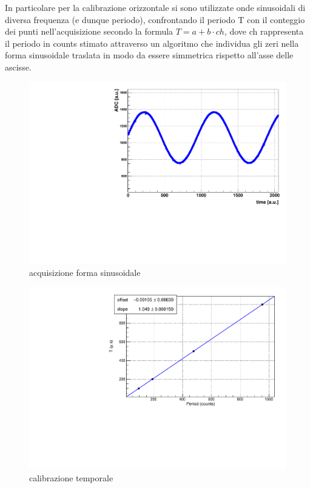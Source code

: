 \documentclass{article}
\begin{document}
In particolare per la calibrazione orizzontale si sono utilizzate onde sinusoidali di diversa frequenza (e dunque periodo), confrontando
il periodo T con il conteggio dei punti nell'acquisizione secondo la formula $T = a + b \cdot ch$, dove ch rappresenta il periodo in 
counts stimato attraverso un algoritmo che individua gli zeri nella forma sinusoidale traslata in modo da essere simmetrica rispetto all'asse
delle ascisse.

\begin{center}
\begin{figure}[H]
\centering
\includegraphics[scale=0.4, angle=0]{4_1.pdf}
\caption{acquisizione forma sinusoidale}
\label{fig:period_counts}
\end{figure}
\end{center}

\begin{center}
\begin{figure}[H]
\centering
\includegraphics[scale=0.4, angle=0]{calibtempi.pdf}
\caption{calibrazione temporale}
\label{fig:calibtempi}
\end{figure}
\end{center}
\end{document}
